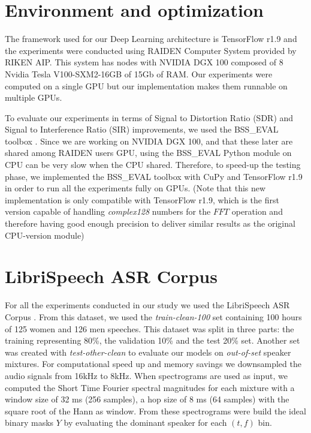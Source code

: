 \documentclass[master,final,11pt]{iscs-thesis}
\begin{document}
\section{Environment and optimization}

The framework used for our Deep Learning architecture is TensorFlow r1.9 \cite{TF} and the experiments were conducted using RAIDEN Computer System provided by RIKEN AIP. This system has nodes with NVIDIA DGX 100 composed of 8 Nvidia Tesla V100-SXM2-16GB of 15Gb of RAM. Our experiments were computed on a single GPU but our implementation makes them runnable on multiple GPUs. 

To evaluate our experiments in terms of Signal to Distortion Ratio (SDR) and Signal to Interference Ratio (SIR) improvements, we used the BSS\_EVAL toolbox \cite{BSS}. Since we are working on NVIDIA DGX 100, and that these later are shared among RAIDEN users GPU, using the BSS\_EVAL Python module on CPU can be  very slow when the CPU shared. Therefore, to speed-up the testing phase, we implemented the BSS\_EVAL toolbox with CuPy \cite{cupy} and TensorFlow r1.9 in order to run all the experiments fully on GPUs. (Note that this new implementation is only compatible with TensorFlow r1.9, which is the first version capable of handling \textit{complex128} numbers for the $FFT$ operation and therefore having good enough precision to deliver similar results as the original CPU-version module)

\section{LibriSpeech ASR Corpus}

For all the experiments conducted in our study we used the LibriSpeech ASR Corpus \cite{LIBRI}. From this dataset, we used the \textit{train-clean-100} set containing 100 hours of 125 women and 126 men speeches. This dataset was split in three parts: the training representing 80\%, the validation 10\% and the test 20\% set. Another set was created with \textit{test-other-clean} to evaluate our models on \textit{out-of-set} speaker mixtures. For computational speed up and memory savings we downsampled the audio signals from 16kHz to 8kHz.
When spectrograms are used as input, we computed the Short Time Fourier spectral magnitudes for each mixture with a window size of 32 ms (256 samples), a hop size of 8 ms (64 samples) with the square root of the Hann as window. From these spectrograms were build the ideal binary masks $Y$ by evaluating the dominant speaker for each $(t,f)$ bin.
\end{document}
